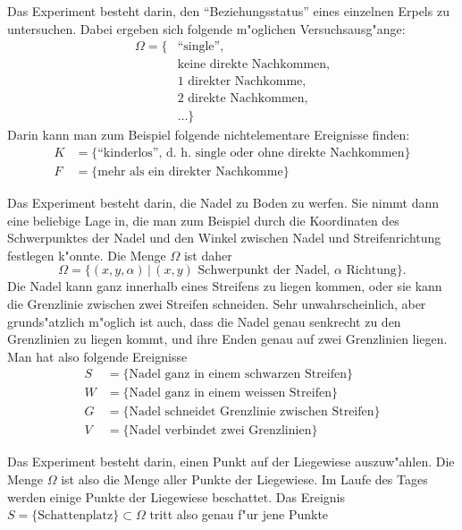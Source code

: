 \begin{loesung}
\begin{teilaufgaben}
\item Das Experiment besteht darin, den ``Beziehungsstatus'' eines
einzelnen Erpels zu untersuchen. Dabei ergeben sich folgende m"oglichen
Versuchsausg"ange:
\begin{align*}
\Omega=\{&\text{``single''},\\
&\text{keine direkte Nachkommen},\\
&\text{1 direkter Nachkomme},\\
&\text{2 direkte Nachkommen},\\
&\dots \}
\end{align*}
Darin kann man zum Beispiel folgende nichtelementare Ereignisse finden:
\begin{align*}
K&=\{\text{``kinderlos'', d.~h.~single oder ohne direkte Nachkommen}\}\\
F&=\{\text{mehr als ein direkter Nachkomme}\}
\end{align*}
\item
Das Experiment besteht darin, die Nadel zu Boden zu werfen. Sie nimmt dann
eine beliebige Lage in, die man zum Beispiel durch die Koordinaten
des Schwerpunktes der Nadel und den Winkel zwischen Nadel und Streifenrichtung
festlegen k"onnte. Die Menge $\Omega$ ist daher
\[
\Omega=\{ (x,y,\alpha) \,|\, \text{$(x,y)$ Schwerpunkt der Nadel, $\alpha$ Richtung}\}.
\]
Die Nadel kann ganz innerhalb eines Streifens zu liegen kommen, oder sie
kann die Grenzlinie zwischen zwei Streifen schneiden. Sehr unwahrscheinlich,
aber grunds"atzlich m"oglich ist auch, dass die Nadel genau senkrecht
zu den Grenzlinien zu liegen kommt, und ihre Enden genau auf zwei Grenzlinien
liegen. Man hat also folgende Ereignisse
\begin{align*}
S&=\{ \text{Nadel ganz in einem schwarzen Streifen}\}\\
W&=\{ \text{Nadel ganz in einem weissen Streifen}\}\\
G&=\{ \text{Nadel schneidet Grenzlinie zwischen Streifen}\}\\
V&=\{ \text{Nadel verbindet zwei Grenzlinien}\}
\end{align*}
\item
Das Experiment besteht darin, einen Punkt auf der Liegewiese auszuw"ahlen.
Die Menge $\Omega$ ist also die Menge aller Punkte der Liegewiese.
Im Laufe des Tages werden einige Punkte der Liegewiese beschattet.
Das Ereignis $S=\{\text{Schattenplatz}\}\subset\Omega$
tritt also genau f"ur jene Punkte

\end{teilaufgaben}
\end{loesung}
